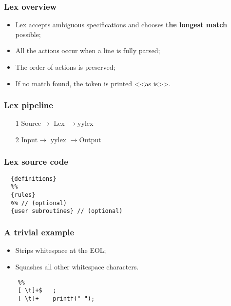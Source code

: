 \documentclass[14pt]{beamer}
\begin{document}
	\begin{frame}
	
		\frametitle{Lex overview}
		\begin{itemize}
			\item Lex accepts ambiguous specifications and chooses \textbf{the longest match} possible;
			\item All the actions occur when a line is fully parsed;
			\item The order of actions is preserved;
			\item If no match found, the token is printed <<as is>>.
		\end{itemize}
	\end{frame}

	\begin{frame}
		
		\frametitle{Lex pipeline}
		\begin{itemize}
			\item[1] $ \text{Source} \rightarrow \boxed{\text{ Lex }} \rightarrow \text{yylex} $
			\item[2] $ \text{Input} \rightarrow \boxed{\text{ yylex }} \rightarrow \text{Output} $
		\end{itemize}
	\end{frame}

\begin{frame}[fragile]
	
	\frametitle{Lex source code}	
	
	\begin{lstlisting}
  {definitions}
  %%
  {rules}
  %% // (optional)
  {user subroutines} // (optional)
	\end{lstlisting}
	
\end{frame}

\begin{frame}[fragile]

\frametitle{A trivial example}
	
\begin{itemize}
	\item Strips whitespace at the EOL;
	\item Squashes all other whitespace characters.
\end{itemize}	

	\begin{lstlisting}
	%%
	[ \t]+$   ; 
	[ \t]+    printf(" ");
	\end{lstlisting}

	
\end{frame}
\end{document}
